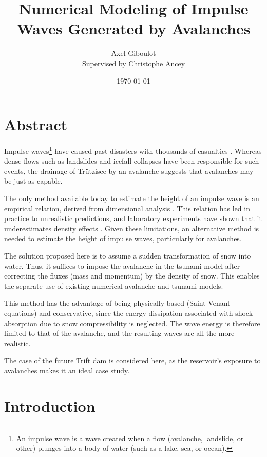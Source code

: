 \documentclass[11pt]{article}
\title{Numerical Modeling of Impulse Waves Generated by Avalanches}
\author{Axel Giboulot\\Supervised by Christophe Ancey}
\date{\today}
\begin{document}
\maketitle

\tableofcontents

\clearpage


\section*{Abstract}

Impulse waves\footnote{An impulse wave is a wave created when a flow (avalanche, landslide, or other) plunges into a body of water (such as a lake, sea, or ocean).}
have caused past disasters with thousands of casualties \citep{Vajont, Palcacocha}.
Whereas dense flows such as landslides and icefall collapses have been responsible for such events,
the drainage of Trützisee \citep{Trutzisee} by an avalanche suggests that avalanches may be just as capable.

The only method available today to estimate the height of an impulse wave is an empirical relation, derived from dimensional analysis \citep{heller}.
This relation has led in practice to unrealistic predictions, and laboratory experiments have shown that it underestimates density effects \citep{zitti}. %
Given these limitations, an alternative method is needed to estimate the height of impulse waves, particularly for avalanches.

The solution proposed here is to assume a sudden transformation of snow into water.
Thus, it suffices to impose the avalanche in the tsunami model after correcting the fluxes (mass and momentum) by the density of snow.
This enables the separate use of existing numerical avalanche and tsunami models.

This method has the advantage of being physically based (Saint-Venant equations) and conservative, since the energy dissipation associated with shock absorption due to snow compressibility is neglected.
The wave energy is therefore limited to that of the avalanche, and the resulting waves are all the more realistic.

The case of the future Trift dam \citep{manso} is considered here, as the reservoir's exposure to avalanches makes it an ideal case study.

\section{Introduction}
\end{document}
